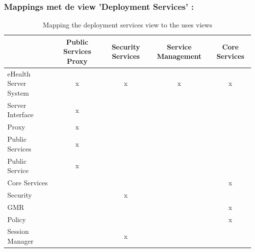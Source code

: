 \documentclass[a4paper,10pt]{article}
\begin{document}
\subsubsection*{Mappings met de view 'Deployment Services' : }
\begin{table}[h!]
\begin{center}
 \begin{tabular}{l| c | c | c | c |} 
 & Public Services Proxy & Security Services & Service Management & Core Services \\ \hline
eHealth Server System & x & x & x & x \\ \hline
\hspace{6pt}Server Interface & x & & & \\ \hline
\hspace{12pt}Proxy & x & & & \\ \hline
\hspace{6pt}Public Services & x & & & \\ \hline
\hspace{12pt}Public Service & x & & & \\ \hline
\hspace{6pt}Core Services & & & & x \\ \hline
\hspace{12pt}Security & & x & & \\ \hline
\hspace{12pt}GMR & & & & x \\ \hline
\hspace{12pt}Policy & & & & x \\ \hline
\hspace{12pt}Session Manager & & x & & \\ \hline
\end{tabular}
\caption{Mapping the deployment services view to the uses views}
\end{center}
\end{table}
\end{document}
